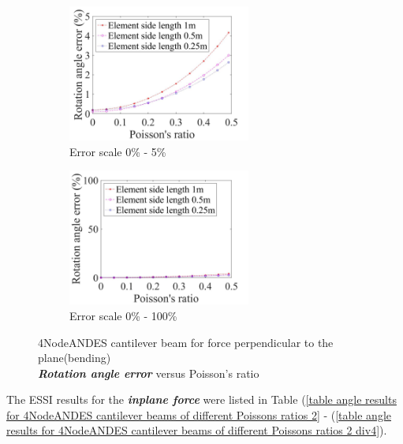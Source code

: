 \documentclass[fleqn,11pt]{article}
\begin{document}
\begin{figure}[H]
  \begin{subfigure}{0.5\textwidth}
    \centering
    \includegraphics[width=6cm]{../Figure-files/error4andes_beam_dif_poisson_angle_bend_div.jpeg}
    \caption{Error scale 0\% - 5\%}
  \end{subfigure}
  \begin{subfigure}{0.5\textwidth}
    \centering
    \includegraphics[width=6cm]{../Figure-files/error4andes_beam_dif_poisson_angle_bend_div100.jpeg}
    \caption{Error scale 0\% - 100\%}
  \end{subfigure}
  \captionsetup{justification=centering,margin=2cm}
  \caption{4NodeANDES cantilever beam for force perpendicular to the plane(bending)\\
      \emph{\textbf{Rotation angle error}}   versus   Poisson's ratio}
  \label{table angle error 4NodeANDES cantilever beam for different Poisson ratio}
\end{figure}











The ESSI results for the \textbf{\emph{inplane force}} were listed in Table (\ref{table angle results for 4NodeANDES cantilever beams of different Poissons ratios 2} - (\ref{table angle results for 4NodeANDES cantilever beams of different Poissons ratios 2 div4}). 
\end{document}
